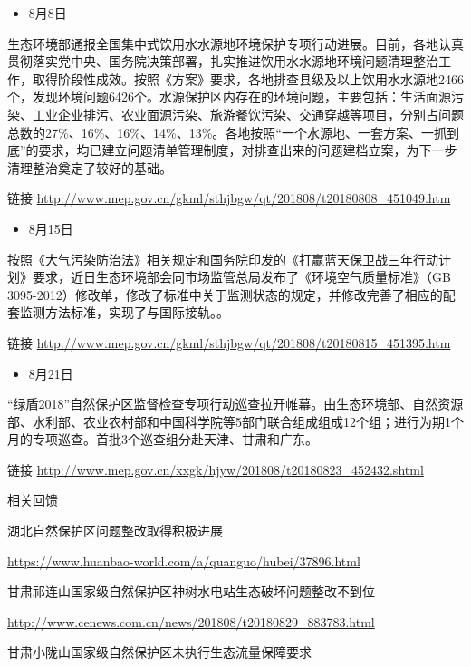 \documentclass[]{book}
\providecommand{\tightlist}{%
  \setlength{\itemsep}{0pt}\setlength{\parskip}{0pt}}
\begin{document}
\begin{itemize}
\tightlist
\item
  8月8日
\end{itemize}

生态环境部通报全国集中式饮用水水源地环境保护专项行动进展。目前，各地认真贯彻落实党中央、国务院决策部署，扎实推进饮用水水源地环境问题清理整治工作，取得阶段性成效。按照《方案》要求，各地排查县级及以上饮用水水源地2466个，发现环境问题6426个。水源保护区内存在的环境问题，主要包括：生活面源污染、工业企业排污、农业面源污染、旅游餐饮污染、交通穿越等项目，分别占问题总数的27\%、16\%、16\%、14\%、13\%。各地按照``一个水源地、一套方案、一抓到底''的要求，均已建立问题清单管理制度，对排查出来的问题建档立案，为下一步清理整治奠定了较好的基础。

链接 \url{http://www.mep.gov.cn/gkml/sthjbgw/qt/201808/t20180808_451049.htm}

\begin{itemize}
\tightlist
\item
  8月15日
\end{itemize}

按照《大气污染防治法》相关规定和国务院印发的《打赢蓝天保卫战三年行动计划》要求，近日生态环境部会同市场监管总局发布了《环境空气质量标准》（GB 3095-2012）修改单，修改了标准中关于监测状态的规定，并修改完善了相应的配套监测方法标准，实现了与国际接轨。。

链接 \url{http://www.mep.gov.cn/gkml/sthjbgw/qt/201808/t20180815_451395.htm}

\begin{itemize}
\tightlist
\item
  8月21日
\end{itemize}

``绿盾2018''自然保护区监督检查专项行动巡查拉开帷幕。由生态环境部、自然资源部、水利部、农业农村部和中国科学院等5部门联合组成组成12个组；进行为期1个月的专项巡查。首批3个巡查组分赴天津、甘肃和广东。

链接 \url{http://www.mep.gov.cn/xxgk/hjyw/201808/t20180823_452432.shtml}

相关回馈

湖北自然保护区问题整改取得积极进展

\url{https://www.huanbao-world.com/a/quanguo/hubei/37896.html}

甘肃祁连山国家级自然保护区神树水电站生态破坏问题整改不到位

\url{http://www.cenews.com.cn/news/201808/t20180829_883783.html}

甘肃小陇山国家级自然保护区未执行生态流量保障要求
\end{document}

